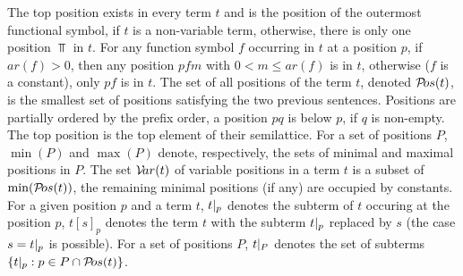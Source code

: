 The top position exists in every term $t$ and is the position of the outermost
functional symbol, if $t$ is a non-variable term, otherwise, there is only
one position $\Top$ in $t$.  For any function symbol $f$ occurring in $t$ at
a position $p$, if \(ar(f)>0\), then any position \(pfm\) with \(0<m\leq
ar(f)\) is in $t$, otherwise ($f$ is a constant), only \(pf\) is in $t$.  The
set of all positions of the term $t$, denoted \({\sl{\cal P}\!os}(t)\), is the smallest set
of positions satisfying the two previous sentences.  Positions are partially
ordered by the prefix order, a position $pq$ is below $p$, if $q$ is
non-empty.  The top position is the top element of their semilattice.  For a
set of positions $P$, \(\min(P)\) and \(\max(P)\) denote,
respectively, the sets of minimal and maximal positions in $P$.  The set 
\({\sl{\cal V}\!ar}(t)\) of variable positions in a term $t$ is a subset of \(\min ({\sl{\cal P}\!os}(t))\), the remaining minimal positions (if any) are occupied by constants.
For a given
position $p$ and a term $t$, \(t|_{p}\) denotes the subterm of $t$
occuring at the position $p$, $t[s]_p$ denotes the term $t$ with the subterm
\(t|_{p}\) replaced by $s$ (the case \(s=t|_{p}\) is 
possible).  For a set of positions $P$, \(t|_{P}\) denotes the set of
subterms \(\{t|_{p}:p\in P\cap {\sl{\cal P}\!os}(t)\}\).
%
